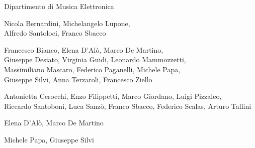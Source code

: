

%
%
	
{\fontsize{24}{22} }

\medskip

{\fontsize{12}{12} \textsf{Dipartimento di Musica Elettronica}}

\vspace{.5cm}

\textbf{}

Nicola Bernardini, Michelangelo Lupone, \\ Alfredo Santoloci, Franco Sbacco

\medskip

\textbf{}

Francesco Bianco, Elena D’Alò, Marco De Martino, \\ Giuseppe Desiato, Virginia Guidi, Leonardo Mammozzetti, \\ Massimiliano Mascaro, Federico Paganelli, Michele Papa, \\Giuseppe Silvi, Anna Terzaroli, Francesco Ziello  

\medskip

\textbf{}

Antonietta Cerocchi, Enzo Filippetti, Marco Giordano, Luigi Pizzaleo, \\ Riccardo Santoboni, Luca Sanzò, Franco Sbacco, Federico Scalas, Arturo Tallini

\medskip

\textbf{}

Elena D’Alò, Marco De Martino

\medskip

\textbf{}

Michele Papa, Giuseppe Silvi

\medskip

\textbf{}


